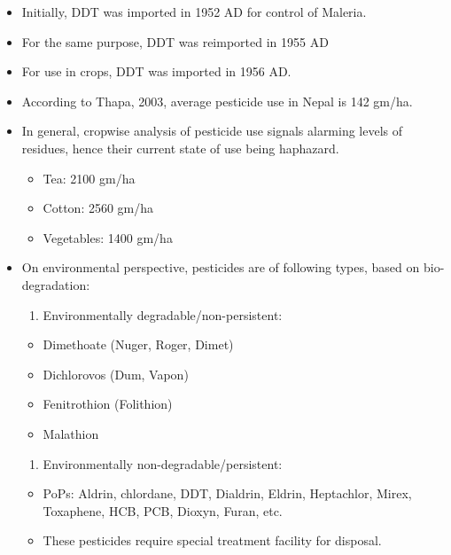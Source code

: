 \documentclass[
  openany]{book}
\providecommand{\tightlist}{%
  \setlength{\itemsep}{0pt}\setlength{\parskip}{0pt}}
\begin{document}
\begin{itemize}
\tightlist
\item
  Initially, DDT was imported in 1952 AD for control of Maleria.
\item
  For the same purpose, DDT was reimported in 1955 AD
\item
  For use in crops, DDT was imported in 1956 AD.
\item
  According to Thapa, 2003, average pesticide use in Nepal is 142 gm/ha.
\item
  In general, cropwise analysis of pesticide use signals alarming levels of residues, hence their current state of use being haphazard.

  \begin{itemize}
  \tightlist
  \item
    Tea: 2100 gm/ha
  \item
    Cotton: 2560 gm/ha
  \item
    Vegetables: 1400 gm/ha
  \end{itemize}
\item
  On environmental perspective, pesticides are of following types, based on bio-degradation:

  \begin{enumerate}
  \def\labelenumi{\arabic{enumi}.}
  \tightlist
  \item
    Environmentally degradable/non-persistent:
  \end{enumerate}

  \begin{itemize}
  \tightlist
  \item
    Dimethoate (Nuger, Roger, Dimet)
  \item
    Dichlorovos (Dum, Vapon)
  \item
    Fenitrothion (Folithion)
  \item
    Malathion
  \end{itemize}

  \begin{enumerate}
  \def\labelenumi{\arabic{enumi}.}
  \setcounter{enumi}{1}
  \tightlist
  \item
    Environmentally non-degradable/persistent:
  \end{enumerate}

  \begin{itemize}
  \tightlist
  \item
    PoPs: Aldrin, chlordane, DDT, Dialdrin, Eldrin, Heptachlor, Mirex, Toxaphene, HCB, PCB, Dioxyn, Furan, etc.
  \item
    These pesticides require special treatment facility for disposal.
  \end{itemize}
\end{itemize}
\end{document}

